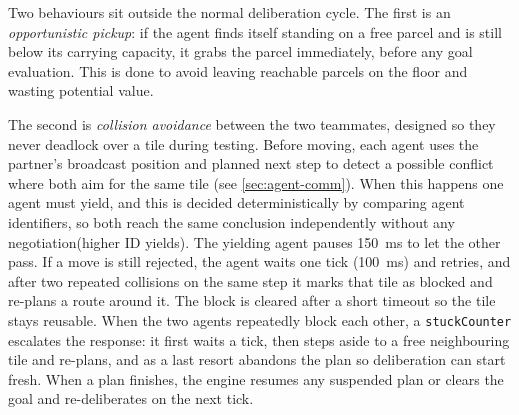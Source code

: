 Two behaviours sit outside the normal deliberation cycle. The first is an
\emph{opportunistic pickup}: if the agent finds itself standing on a free parcel and
is still below its carrying capacity, it grabs the parcel immediately, before any
goal evaluation. This is done to avoid leaving reachable parcels on the floor and wasting potential value.

The second is \emph{collision avoidance} between the two teammates, designed so they
never deadlock over a tile during testing. Before moving, each agent uses the partner's broadcast
position and planned next step to detect a possible conflict where both aim for the same tile (see
\cref{sec:agent-comm}).
When this happens one agent must yield, and this is decided deterministically by comparing agent identifiers,
so both reach the same conclusion independently without any negotiation(higher ID yields). The yielding agent 
pauses \SI{150}{\milli\second} to let the other pass. If a move is still rejected,
the agent waits one tick (\SI{100}{\milli\second}) and retries, and after two repeated
collisions on the same step it marks that tile as blocked and re-plans a route around it.
The block is cleared after a short timeout so the tile stays reusable.
When the two agents repeatedly block each other, a \texttt{stuckCounter} escalates the response: 
it first waits a tick, then steps aside to a free neighbouring tile and re-plans, and as a last resort 
abandons the plan so deliberation can start fresh.
When a plan finishes, the engine resumes any suspended plan or clears the goal and
re-deliberates on the next tick.



